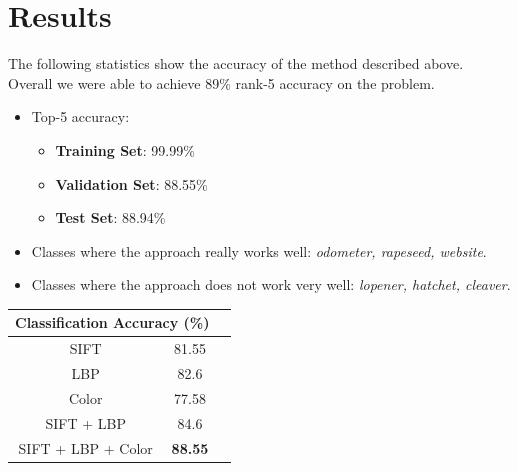 \documentclass[12pt]{article}
\begin{document}
\section{Results}
The following statistics show the accuracy of the method described above. Overall we were able to achieve 89\% rank-5 accuracy on the problem.

\begin{itemize}
\item Top-5 accuracy:
\begin{itemize}
\item \textbf{Training Set}: 99.99\%
\item \textbf{Validation Set}: 88.55\%
\item \textbf{Test Set}: 88.94\%
\end{itemize}
\item Classes where the approach really works well: \textit{odometer, rapeseed, website}.
\item Classes where the approach does not work very well: \textit{lopener, hatchet, cleaver}.
\end{itemize}

\begin{center}
\begin{tabular}[]{| c | c | c | }
\hline
\multicolumn{2}{|c|}{\textbf{Classification Accuracy} (\%)} \\
\hline
SIFT & 81.55\\
\hline
LBP & 82.6\\
\hline
Color & 77.58\\
\hline
SIFT + LBP & 84.6\\
\hline
SIFT + LBP + Color & \textbf{88.55}\\
\hline
\end{tabular}
\end{center}



\end{document}

